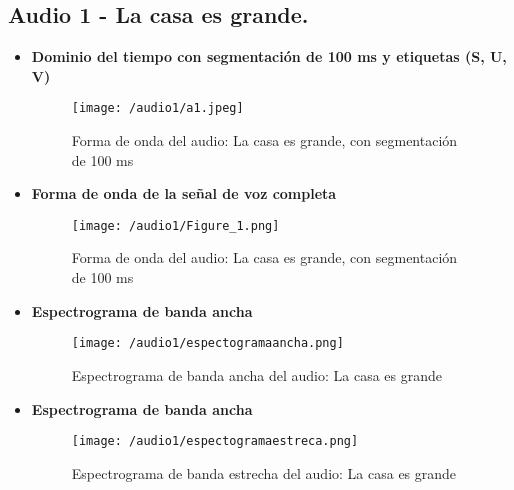 \documentclass{report}
\begin{document}
\subsection{Audio 1 - La casa es grande.}
\begin{itemize}
    \item \textbf{Dominio del tiempo con segmentación de 100 ms y etiquetas (S, U, V)}
    \begin{figure}[h]
        \centering
        \texttt{[image: /audio1/a1.jpeg]}
        \caption{Forma de onda del audio: La casa es grande, con segmentación de 100 ms}
        \label{fig:forma_onda_audio1div}
    \end{figure}
    \item \textbf{Forma de onda de la señal de voz completa}
    \begin{figure}[h]
        \centering
        \texttt{[image: /audio1/Figure\_1.png]}
        \caption{Forma de onda del audio: La casa es grande, con segmentación de 100 ms}
        \label{fig:forma de onda_audio1}
    \end{figure}
    \newpage
    \item \textbf{Espectrograma de banda ancha}
    \begin{figure}[h]
        \centering
        \texttt{[image: /audio1/espectogramaancha.png]}
        \caption{Espectrograma de banda ancha del audio: La casa es grande}
        \label{fig:espectograma de banda ancha audio1}
    \end{figure}
    \item \textbf{Espectrograma de banda ancha}
    \begin{figure}[h]
        \centering
        \texttt{[image: /audio1/espectogramaestreca.png]}
        \caption{Espectrograma de banda estrecha del audio: La casa es grande}
        \label{fig:espectograma de banda estrecha audio1}
    \end{figure}
\end{itemize}
\newpage
\end{document}
